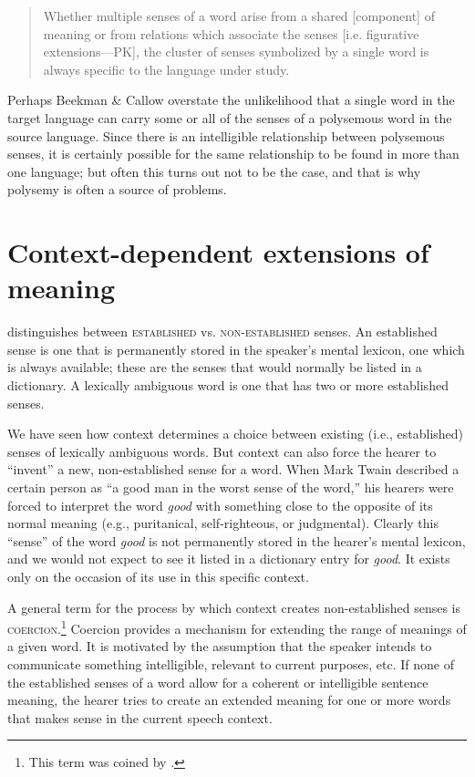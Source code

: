 \begin{quote}
Whether multiple senses of a word arise from a shared [component] of meaning or from relations which associate the senses [i.e. figurative extensions—PK], the cluster of senses symbolized by a single word is always specific to the language under study.
\end{quote}


Perhaps Beekman \& Callow overstate the unlikelihood that a single word in the target language can carry some or all of the senses of a polysemous word in the source language. Since there is an intelligible relationship between polysemous senses, it is certainly possible for the same relationship to be found in more than one language; but often this turns out not to be the case, and that is why polysemy is often a source of problems.


\section{Context-dependent extensions of meaning}\label{sec:} %

\citet{Cruse1986,Cruse2000} distinguishes between \textsc{established} vs. \textsc{non-established} senses. An established sense is one that is permanently stored in the speaker’s mental lexicon, one which is always available; these are the senses that would normally be listed in a dictionary. A lexically ambiguous word is one that has two or more established senses.



We have seen how context determines a choice between existing (i.e., established) senses of lexically ambiguous words. But context can also force the hearer to “invent” a new, non-established sense for a word. When Mark Twain described a certain person as “a good man in the worst sense of the word,” his hearers were forced to interpret the word \textit{good} with something close to the opposite of its normal meaning (e.g., puritanical, self-righteous, or judgmental). Clearly this “sense” of the word \textit{good} is not permanently stored in the hearer’s mental lexicon, and we would not expect to see it listed in a dictionary entry for \textit{good}. It exists only on the occasion of its use in this specific context.



A general term for the process by which context creates non-established senses is \textsc{coercion}.\footnote{This term was coined by \citet{MoensSteedman1988}.} Coercion provides a mechanism for extending the range of meanings of a given word. It is motivated by the assumption that the speaker intends to communicate something intelligible, relevant to current purposes, etc. If none of the established senses of a word allow for a coherent or intelligible sentence meaning, the hearer tries to create an extended meaning for one or more words that makes sense in the current speech context.



